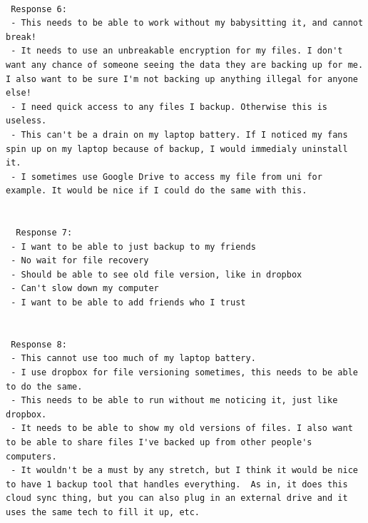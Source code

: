 \documentclass[11pt, a4paper, twocolumn, twoside]{report}
\begin{document}
\begin{lstlisting}[language=RsT, caption=Membrane Feature Survey, label=lst:mbrnsurvey]
  
 Response 6:
 - This needs to be able to work without my babysitting it, and cannot break!
 - It needs to use an unbreakable encryption for my files. I don't want any chance of someone seeing the data they are backing up for me. I also want to be sure I'm not backing up anything illegal for anyone else!
 - I need quick access to any files I backup. Otherwise this is useless.
 - This can't be a drain on my laptop battery. If I noticed my fans spin up on my laptop because of backup, I would immedialy uninstall it.
 - I sometimes use Google Drive to access my file from uni for example. It would be nice if I could do the same with this.
 
 
  Response 7:
 - I want to be able to just backup to my friends
 - No wait for file recovery
 - Should be able to see old file version, like in dropbox
 - Can't slow down my computer
 - I want to be able to add friends who I trust
  
  
 Response 8:
 - This cannot use too much of my laptop battery.
 - I use dropbox for file versioning sometimes, this needs to be able to do the same.
 - This needs to be able to run without me noticing it, just like dropbox.
 - It needs to be able to show my old versions of files. I also want to be able to share files I've backed up from other people's computers.
 - It wouldn't be a must by any stretch, but I think it would be nice to have 1 backup tool that handles everything.  As in, it does this cloud sync thing, but you can also plug in an external drive and it uses the same tech to fill it up, etc.
\end{lstlisting}
\end{document}
